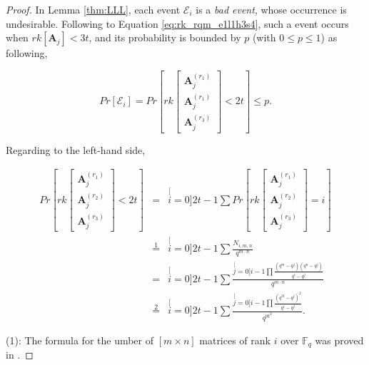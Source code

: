 \begin{proof}
In Lemma \ref{thm:LLL}, each event $\mathcal{E}_{i}$ is a \textit{bad
event}, whose occurrence is undesirable. Following to Equation \ref{eq:rk_rqm_e1l1h3s4},
such a event occurs when $rk\left[\boldsymbol{A}_{j}\right]<3t$,
and its probability is bounded by $p$ (with $0\leq p\leq1$) as following,

\begin{equation}
Pr\left[\mathcal{E}_{i}\right]=Pr\left[rk\left[\begin{array}{c}
\boldsymbol{A}_{j}^{\left(r_{1}\right)}\\
\boldsymbol{A}_{j}^{\left(r_{1}\right)}\\
\boldsymbol{A}_{j}^{\left(r_{3}\right)}
\end{array}\right]<2t\right]\leq p.\label{eq:p_in_LLL}
\end{equation}

Regarding to the left-hand side,

\begin{eqnarray}
Pr\left[rk\left[\begin{array}{c}
\boldsymbol{A}_{j}^{\left(r_{1}\right)}\\
\boldsymbol{A}_{j}^{\left(r_{2}\right)}\\
\boldsymbol{A}_{j}^{\left(r_{3}\right)}
\end{array}\right]<2t\right] & = & \stackrel[i=0]{2t-1}{\mathop{\sum}}Pr\left[rk\left[\begin{array}{c}
\boldsymbol{A}_{j}^{\left(r_{1}\right)}\\
\boldsymbol{A}_{j}^{\left(r_{2}\right)}\\
\boldsymbol{A}_{j}^{\left(r_{3}\right)}
\end{array}\right]=i\right]\nonumber \\
 & \overset{1}{=} & \stackrel[i=0]{2t-1}{\mathop{\sum}}\frac{N_{i,m,n}}{q^{m\cdot n}}\nonumber \\
 & = & \stackrel[i=0]{2t-1}{\mathop{\sum}}\frac{\stackrel[j=0]{i-1}{\mathop{\prod}}\frac{\left(q^{m}-q^{j}\right)\left(q^{n}-q^{j}\right)}{q^{i}-q^{j}}}{q^{m\cdot n}}\nonumber \\
 & \overset{2}{=} & \stackrel[i=0]{2t-1}{\mathop{\sum}}\frac{\stackrel[j=0]{i-1}{\mathop{\prod}}\frac{\left(q^{3t}-q^{j}\right)^{2}}{q^{i}-q^{j}}}{q^{9t^{2}}}.\label{eq:p_eq_h3}
\end{eqnarray}

(1): The formula for the umber of $\left[m\times n\right]$ matrices
of rank $i$ over $\ensuremath{\mathbb{F}}_{q}$ was proved in \cite{Overbeck:2007}.


\end{proof}
